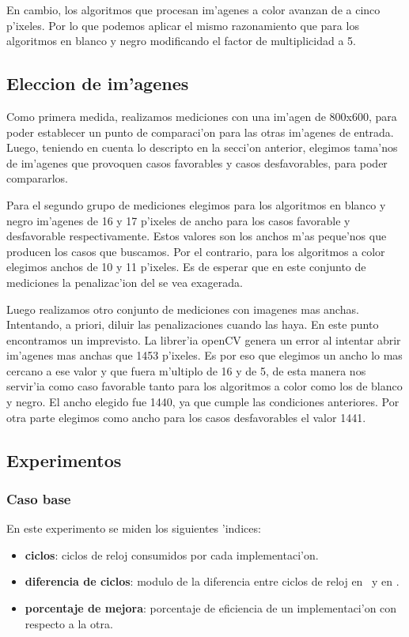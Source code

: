 En cambio, los algoritmos que procesan im'agenes a color avanzan de a cinco p'ixeles. Por lo que podemos aplicar el mismo razonamiento que para los algoritmos en blanco y negro modificando el factor de multiplicidad a 5.

\subsection{Eleccion de im'agenes}
Como primera medida, realizamos mediciones con una im'agen de 800x600, para poder establecer un punto de comparaci'on para las otras im'agenes de entrada. Luego, teniendo en cuenta lo descripto en la secci'on anterior, elegimos tama'nos de im'agenes que provoquen casos favorables y casos desfavorables, para poder compararlos. 

Para el segundo grupo de mediciones elegimos para los algoritmos en blanco y negro im'agenes de 16 y 17 p'ixeles de ancho para los casos favorable y desfavorable respectivamente. Estos valores son los anchos m'as peque'nos que producen los casos que buscamos. Por el contrario, para los algoritmos a color elegimos anchos de 10 y 11 p'ixeles. Es de esperar que en este conjunto de mediciones la penalizac'ion del \ass se vea exagerada.

Luego realizamos otro conjunto de mediciones con imagenes mas anchas. Intentando, a priori, diluir las penalizaciones cuando las haya. En este punto encontramos un imprevisto. La librer'ia openCV genera un error al intentar abrir im'agenes mas anchas que 1453 p'ixeles. Es por eso que elegimos un ancho lo mas cercano a ese valor y que fuera m'ultiplo de 16 y de 5, de esta manera nos servir'ia como caso favorable tanto para los algoritmos a color como los de blanco y negro. El ancho elegido fue 1440, ya que cumple las condiciones anteriores. Por otra parte elegimos como ancho para los casos desfavorables el valor 1441.


\subsection{Experimentos}
\subsubsection{Caso base}
En este experimento se miden los siguientes 'indices:
\begin{itemize}
 \item \textbf{ciclos}: ciclos de reloj consumidos por cada implementaci'on.
 \item \textbf{diferencia de ciclos}: modulo de la diferencia entre ciclos de reloj en \C \ y en \ass.
 \item \textbf{porcentaje de mejora}: porcentaje de eficiencia de un implementaci'on con respecto a la otra.
\end{itemize}

